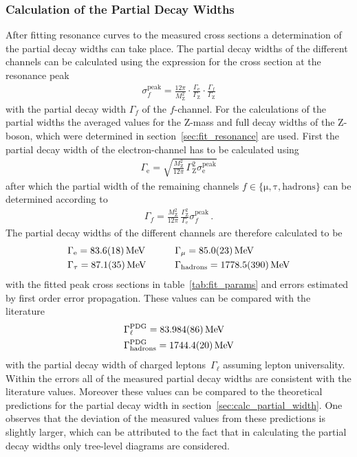 \documentclass[11pt, a4paper]{article}
\numberwithin{equation}{section}
\begin{document}
\subsubsection{Calculation of the Partial Decay Widths}
\label{sec:partial_widths}
After fitting resonance curves to the measured cross sections a determination of the partial decay widths can take place.
The partial decay widths of the different channels can be calculated using the expression for the cross section at the resonance peak \cite{instructions}
\begin{align*}
	\sigma_f^\mathrm{peak} = \frac{12 \pi}{M_\mathrm{Z}^2} \cdot \frac{\Gamma_\mathrm{e}}{\Gamma_\mathrm{Z}} \cdot \frac{\Gamma_f}{\Gamma_\mathrm{Z}}
\end{align*}
with the partial decay width $\Gamma_f$ of the $f$-channel.
For the calculations of the partial widths the averaged values for the Z-mass and full decay widths of the Z-boson, which were determined in section~\ref{sec:fit_resonance} are used.
First the partial decay width of the electron-channel has to be calculated using
\begin{align*}
	\Gamma_\mathrm{e} = \sqrt{\frac{M_\mathrm{Z}^2}{12 \pi} \, \Gamma_\mathrm{Z}^2 \sigma_\mathrm{e}^\mathrm{peak}}
\end{align*}
after which the partial width of the remaining channels $f \in \{ \mathrm{\mu}, \mathrm{\tau}, \mathrm{hadrons} \}$ can be determined according to
\begin{align*}
	\Gamma_f = \frac{M_\mathrm{Z}^2}{12 \pi } \, \frac{\Gamma_\mathrm{Z}^2 }{\Gamma_\mathrm{e}} \sigma_f^\mathrm{peak} \,\text{.}
\end{align*}
The partial decay widths of the different channels are therefore calculated to be
\begin{alignat*}{2}
	&\Gamma_\mathrm{e} = \SI{83.6 +- 1.8}{MeV} \qquad
	&&\Gamma_\mathrm{\mu} = \SI{85.0 +- 2.3}{MeV}\\
	&\Gamma_\mathrm{\tau} = \SI{87.1 +- 3.5}{MeV}\qquad
	&&\Gamma_\mathrm{hadrons} = \SI{1778.5 +- 39}{MeV}
\end{alignat*}
with the fitted peak cross sections in table~\ref{tab:fit_params} and errors estimated by first order error propagation.
These values can be compared with the literature \cite{pdg}
\begin{align*}
	&\Gamma_\ell^\mathrm{PDG} = \SI{83.984 +- 0.086}{MeV} \\
	&\Gamma_\mathrm{hadrons}^\mathrm{PDG} = \SI{1744.4 +- 2.0}{MeV}
\end{align*}
with the partial decay width of charged leptons~$\Gamma_\ell$ assuming lepton universality.
Within the errors all of the measured partial decay widths are consistent with the literature values.
Moreover these values can be compared to the theoretical predictions for the partial decay width in section~\ref{sec:calc_partial_width}.
One observes that the deviation of the measured values from these predictions is slightly larger, which can be attributed to the fact that in calculating the partial decay widths only tree-level diagrams are considered.
\end{document}
